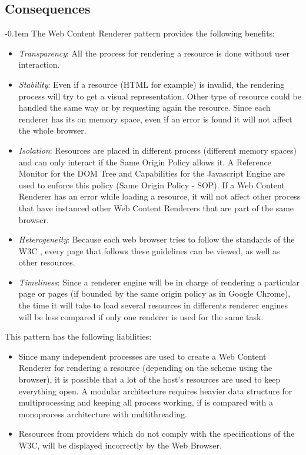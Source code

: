 \documentclass[prodmode,acmtecs]{acmsmall}
\begin{document}
  \subsection*{Consequences}
  \leftskip-0.1em The Web Content Renderer pattern provides the following benefits:
  \begin{itemize}\leftskip0.2em
    \item \textit{Transparency}: All the process for rendering a resource is done without user interaction.
    \item \textit{Stability}: Even if a resource (HTML for example) is invalid, the rendering process will try to get a visual representation. Other type of resource could be handled the same way or by requesting again the resource. Since each renderer has its on memory space, even if an error is found it will not affect the whole browser.
    \item \textit{Isolation}: Resources are placed in different process (different memory spaces) and can only interact if the Same Origin Policy allows it. A Reference Monitor for the DOM Tree and Capabilities for the Javascript Engine are used to enforce this policy (Same Origin Policy - SOP). If a Web Content Renderer has an error while loading a resource, it will not affect other process that have instanced other Web Content Renderers that are part of the same browser.
    \item \textit{Heterogeneity}: Because each web browser tries to follow the standards of the W3C \cite{w3c}, every page that follows these guidelines can be viewed, as well as other resources.
    \item \textit{Timeliness}: Since a renderer engine will be in charge of rendering a particular page or pages (if bounded by the same origin policy as in Google Chrome), the time it will take to load several resources in differents renderer engines will be less compared if only one renderer is used for the same task.
  \end{itemize}
  This pattern has the following liabilities:
  \begin{itemize}\leftskip0.2em
    \item Since many independent processes are used to create a Web Content Renderer for rendering a resource (depending on the scheme using the browser), it is possible that a lot of the host's resources are used to keep everything open. A modular architecture requires heavier data structure for multiprocessing and keeping all process working, if is compared with a monoprocess architecture with multithreading.
    \item Resources from providers which do not comply with the specifications of the W3C, will be displayed incorrectly by the Web Browser.
  \end{itemize}
\end{document}
